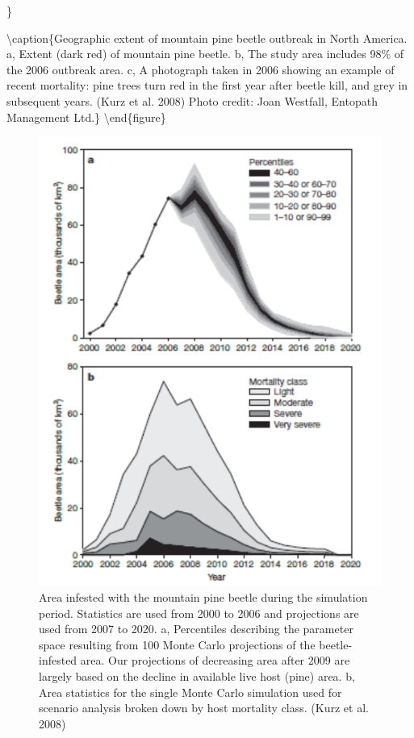 \documentclass[12pt,oneside]{book}
\begin{document}
\}

\textbackslash{}caption\{Geographic extent of mountain pine beetle
outbreak in North America. a, Extent (dark red) of mountain pine beetle.
b, The study area includes 98\% of the 2006 outbreak area. c, A
photograph taken in 2006 showing an example of recent mortality: pine
trees turn red in the first year after beetle kill, and grey in
subsequent years. (Kurz et al. 2008) Photo credit: Joan Westfall,
Entopath Management Ltd.\}\label{fig:f810} \textbackslash{}end\{figure\}

\begin{figure}

{\centering \includegraphics[width=0.8\linewidth]{figures/chap8/f811_Kurz2} 

}

\caption{Area infested with the mountain pine beetle during the simulation period. Statistics are used from 2000 to 2006 and projections are used from 2007 to 2020. a, Percentiles describing the parameter space resulting from 100 Monte Carlo projections of the beetle-infested area. Our projections of decreasing area after 2009 are largely based on the decline in available live host (pine) area. b, Area statistics for the single Monte Carlo simulation used for scenario analysis broken down by host mortality class. (Kurz et al. 2008)}\label{fig:f811}
\end{figure}
\end{document}
